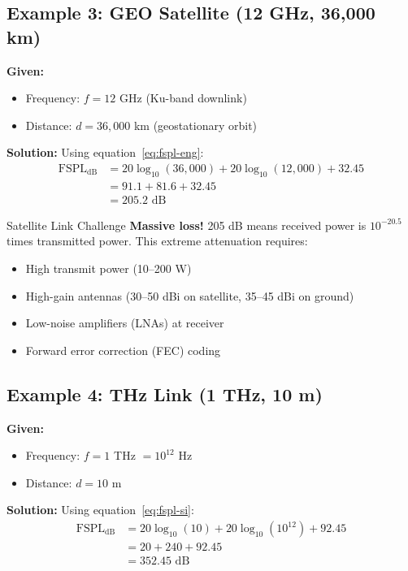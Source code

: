 \subsection{Example 3: GEO Satellite (12 GHz, 36,000 km)}

\textbf{Given:}
\begin{itemize}
\item Frequency: $f = 12$ GHz (Ku-band downlink)
\item Distance: $d = 36{,}000$ km (geostationary orbit)
\end{itemize}

\textbf{Solution:} Using equation~\eqref{eq:fspl-eng}:
\begin{align}
\text{FSPL}_{\text{dB}} &= 20\log_{10}(36{,}000) + 20\log_{10}(12{,}000) + 32.45 \nonumber \\
&= 91.1 + 81.6 + 32.45 \nonumber \\
&= 205.2 \text{ dB}
\end{align}

\begin{calloutbox}{Satellite Link Challenge}
\textbf{Massive loss!} 205 dB means received power is $10^{-20.5}$ times transmitted power. This extreme attenuation requires:
\begin{itemize}
\item High transmit power (10--200 W)
\item High-gain antennas (30--50 dBi on satellite, 35--45 dBi on ground)
\item Low-noise amplifiers (LNAs) at receiver
\item Forward error correction (FEC) coding
\end{itemize}
\end{calloutbox}

\subsection{Example 4: THz Link (1 THz, 10 m)}

\textbf{Given:}
\begin{itemize}
\item Frequency: $f = 1$ THz $= 10^{12}$ Hz
\item Distance: $d = 10$ m
\end{itemize}

\textbf{Solution:} Using equation~\eqref{eq:fspl-si}:
\begin{align}
\text{FSPL}_{\text{dB}} &= 20\log_{10}(10) + 20\log_{10}(10^{12}) + 92.45 \nonumber \\
&= 20 + 240 + 92.45 \nonumber \\
&= 352.45 \text{ dB}
\end{align}

